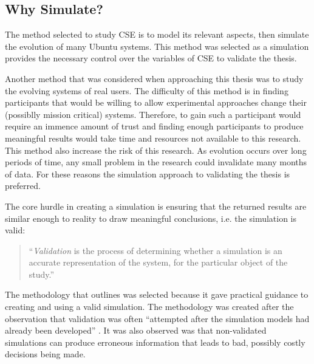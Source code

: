 \subsection{Why Simulate?}
The method selected to study CSE is to model its relevant aspects, then simulate the evolution of many Ubuntu systems.
This method was selected as a simulation provides the necessary control over the variables of CSE to validate the thesis.

Another method that was considered when approaching this thesis was to study the evolving systems of real users.
The difficulty of this method is in finding participants that would be willing 
to allow experimental approaches change their (possiblly mission critical) systems.
Therefore, to gain such a participant would require an immence amount of trust
and finding enough participants to produce meaningful results would take time and resources not available to this research.
This method also increase the risk of this research. 
As evolution occurs over long periods of time, any small problem in the research could invalidate many months of data.  
For these reasons the simulation approach to validating the thesis is preferred.

The core hurdle in creating a simulation is ensuring that the returned results are similar enough to reality to draw meaningful conclusions, i.e. the simulation is valid:
\begin{quotation}
``\textit{Validation} is the process of determining whether a simulation is an accurate representation of the system, for the particular object of the study.'' \citep{Law2005}
\end{quotation}

The methodology that \cite{Law2005} outlines was selected because it gave practical guidance to creating and using a valid simulation.
The methodology was created after the observation that validation was often ``attempted after the simulation models had already been developed'' \citep{Law2005}.
It was also observed was that non-validated simulations can produce erroneous information that leads to bad, possibly costly decisions being made.

